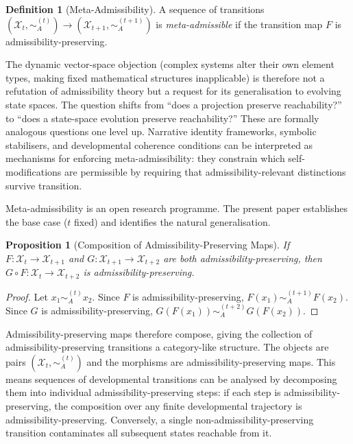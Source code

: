 \documentclass[10pt,twocolumn]{article}
\theoremstyle{plain}
\newtheorem{proposition}{Proposition}
\theoremstyle{definition}
\newtheorem{definition}{Definition}
\theoremstyle{remark}
\newcommand{\calX}{\mathcal{X}}
\begin{document}
\begin{definition}[Meta-Admissibility]
A sequence of transitions $(\calX_t,\sim_A^{(t)})\to(\calX_{t+1},\sim_A^{(t+1)})$
is \emph{meta-admissible} if the transition map $F$ is admissibility-preserving.
\end{definition}

The dynamic vector-space objection (complex systems alter their own element types,
making fixed mathematical structures inapplicable) is therefore not a refutation
of admissibility theory but a request for its generalisation to evolving state
spaces. The question shifts from ``does a projection preserve reachability?'' to
``does a state-space evolution preserve reachability?'' These are formally
analogous questions one level up. Narrative identity frameworks, symbolic
stabilisers, and developmental coherence conditions can be interpreted as
mechanisms for enforcing meta-admissibility: they constrain which self-modifications
are permissible by requiring that admissibility-relevant distinctions survive
transition.

Meta-admissibility is an open research programme. The present paper establishes
the base case ($t$ fixed) and identifies the natural generalisation.

\begin{proposition}[Composition of Admissibility-Preserving Maps]
\label{prop:compose}
If $F:\calX_t\to\calX_{t+1}$ and $G:\calX_{t+1}\to\calX_{t+2}$ are both
admissibility-preserving, then $G\circ F:\calX_t\to\calX_{t+2}$ is
admissibility-preserving.
\end{proposition}

\begin{proof}
Let $x_1\sim_A^{(t)} x_2$. Since $F$ is admissibility-preserving,
$F(x_1)\sim_A^{(t+1)} F(x_2)$. Since $G$ is admissibility-preserving,
$G(F(x_1))\sim_A^{(t+2)} G(F(x_2))$.
\end{proof}

Admissibility-preserving maps therefore compose, giving the collection of
admissibility-preserving transitions a category-like structure. The objects are
pairs $(\calX_t,\sim_A^{(t)})$ and the morphisms are admissibility-preserving
maps. This means sequences of developmental transitions can be analysed by
decomposing them into individual admissibility-preserving steps: if each step
is admissibility-preserving, the composition over any finite developmental
trajectory is admissibility-preserving. Conversely, a single non-admissibility-preserving
transition contaminates all subsequent states reachable from it.
\end{document}
